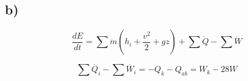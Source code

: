 

\subsection*{b)}

\[
\frac{dE}{dt} = \sum \dot{m} (h_i + \frac{v^2}{2} + gz) + \sum \dot{Q} - \sum \dot{W}
\]

\[
\sum \dot{Q_i} - \sum \dot{W_i} = -Q_k - Q_{ab} = W_k - 28W
\]